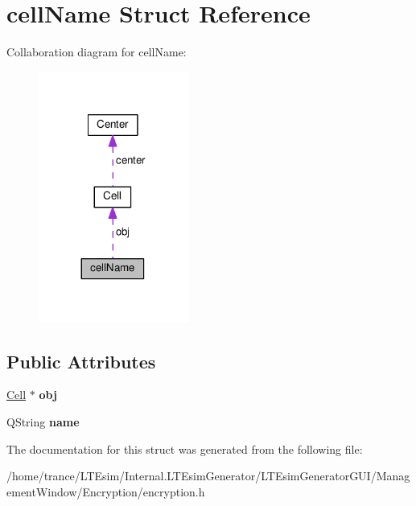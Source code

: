 \hypertarget{structcell_name}{}\section{cell\+Name Struct Reference}
\label{structcell_name}


Collaboration diagram for cell\+Name\+:
\nopagebreak
\begin{figure}[H]
\begin{center}
\leavevmode
\includegraphics[width=140pt]{structcell_name__coll__graph}
\end{center}
\end{figure}
\subsection*{Public Attributes}
\begin{DoxyCompactItemize}
\item 
\hyperlink{class_cell}{Cell} $\ast$ {\bfseries obj}\hypertarget{structcell_name_a127eb40699418eb2d0c366af3c432d70}{}\label{structcell_name_a127eb40699418eb2d0c366af3c432d70}

\item 
Q\+String {\bfseries name}\hypertarget{structcell_name_aacec58e68a6e50aea041ec8848e0639f}{}\label{structcell_name_aacec58e68a6e50aea041ec8848e0639f}

\end{DoxyCompactItemize}


The documentation for this struct was generated from the following file\+:\begin{DoxyCompactItemize}
\item 
/home/trance/\+L\+T\+Esim/\+Internal.\+L\+T\+Esim\+Generator/\+L\+T\+Esim\+Generator\+G\+U\+I/\+Management\+Window/\+Encryption/encryption.\+h\end{DoxyCompactItemize}

